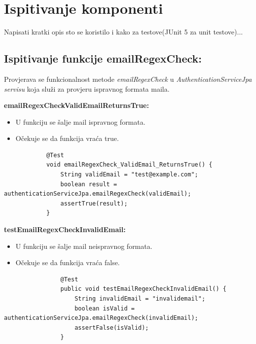 			\section{Ispitivanje komponenti}
			Napisati kratki opis sto se koristilo i kako za testove(JUnit 5 za unit testove)...
			
			\subsection{Ispitivanje funkcije emailRegexCheck:}
			Provjerava se funkcionalnost metode \textit{emailRegexCheck} u \textit{AuthenticationServiceJpa servisu} koja služi za provjeru ispravnog formata maila.
			
			\textbf{emailRegexCheckValidEmailReturnsTrue:}
			\begin{itemize}
				\item U funkciju se šalje mail ispravnog formata.
				\item Očekuje se da funkcija vraća true.
			\end{itemize}
			\begin{lstlisting}
			@Test
			void emailRegexCheck_ValidEmail_ReturnsTrue() {
				String validEmail = "test@example.com";
				boolean result = authenticationServiceJpa.emailRegexCheck(validEmail);
				assertTrue(result);
			}
			\end{lstlisting}
			
			\textbf{testEmailRegexCheckInvalidEmail:}
			\begin{itemize}
				\item U funkciju se šalje mail neispravnog formata.
				\item Očekuje se da funkcija vraća false.
			\end{itemize}
			\begin{lstlisting}
				@Test
				public void testEmailRegexCheckInvalidEmail() {
					String invalidEmail = "invalidemail";
					boolean isValid = authenticationServiceJpa.emailRegexCheck(invalidEmail);
					assertFalse(isValid);
				}
			\end{lstlisting}
			
